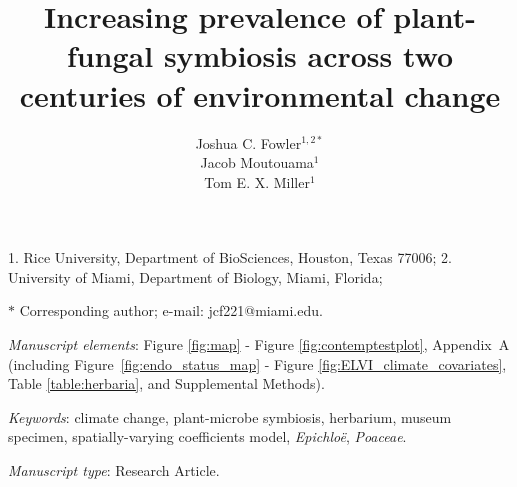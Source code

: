 \documentclass[11pt]{article}
\title{Increasing prevalence of plant-fungal symbiosis across two centuries of environmental change}
\author{Joshua C. Fowler$^{1,2\ast}$ \\
	Jacob Moutouama$^{1}$\\
	Tom E. X. Miller$^{1}$}
\date{}
\begin{document}
	
	\maketitle
	
	\noindent{} 1. Rice University, Department of BioSciences, Houston, Texas 77006;
	\noindent{} 2. University of Miami, Department of Biology, Miami, Florida;


	\noindent{} $\ast$ Corresponding author; e-mail: jcf221@miami.edu.
	
	\bigskip
	
	\textit{Manuscript elements}: Figure \ref{fig:map} - Figure \ref{fig:contemptestplot}, Appendix~A (including Figure~\ref{fig:endo_status_map} - Figure \ref{fig:ELVI_climate_covariates},  Table \ref{table:herbaria}, and Supplemental Methods).
	
	\bigskip
	
	\textit{Keywords}: climate change, plant-microbe symbiosis, herbarium, museum specimen, spatially-varying coefficients model, \emph{Epichloë}, \emph{Poaceae}.
	
	\bigskip
	
	\textit{Manuscript type}: Research Article. %
	
	\bigskip
	
	
	
	\newpage{}
	
\end{document}
